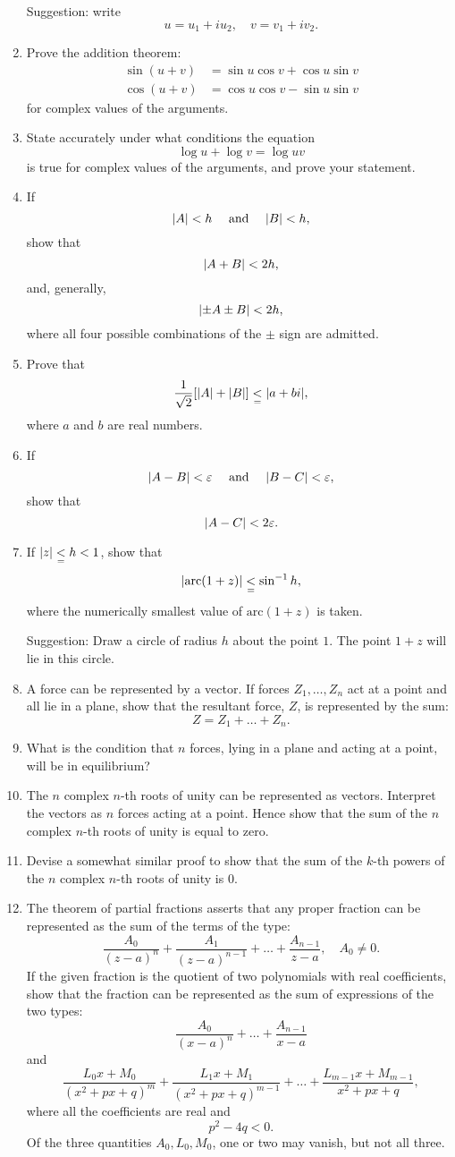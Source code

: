 \documentclass[letter,oneside]{memoir}
\begin{document}
\begin{enumerate}
	Suggestion: write
	\[
	u=u_1+iu_2, \quad v=v_1+iv_2
	.\] 
\item Prove the addition theorem:
	\begin{align*}
		\sin (u+v)&=\sin u\cos v+\cos u\sin v\\
		\cos (u+v)&=\cos u\cos v-\sin u\sin v
	\end{align*} for complex values of the arguments.
\item State accurately under what conditions the equation
	\[
	\log u+\log v=\log uv
	\] is true for complex values of the arguments, and prove your statement.
\item If
	\[
	\abs*{A} <h \quad \text{ and } \quad \abs*{B} <h
	,\] show that
	\[
	\abs*{A+B} <2h
	,\] and, generally,
	\[
	\abs*{\pm A\pm B} <2h
	,\] where all four possible combinations of the $\pm$ sign are admitted.
\item Prove that
	\[
		\frac{1}{\sqrt{2} } \sbr*{\abs*{A} +\abs*{B} } \underset{=}{<} \abs*{a+bi} 
	,\] where $a$ and $b$ are real numbers.
\item If
	\[
	\abs*{A-B} <\epsilon \quad \text{ and } \quad \abs*{B-C} <\epsilon
	,\] show that
	 \[
	\abs*{A-C} <2\epsilon
	.\] 
\item If $\abs*{z} \underset{=}{<} h <1$, show that
	\[
		\abs*{\text{arc} (1+z)} \underset{=}{<} \sin ^{-1}h
	,\] where the numerically smallest value of $\text{arc} (1+z)$ is taken. 

	Suggestion: Draw a circle of radius $h$ about the point $1$. The point $1+z$ will lie in this circle.
\item A force can be represented by a vector. If forces $Z_1, \dots , Z_n$ act at a point and all lie in a plane, show that the resultant force, $Z$, is represented by the sum:
	\[
	Z=Z_1+\dots +Z_n
	.\] 
\item What is the condition that $n$ forces, lying in a plane and acting at a point, will be in equilibrium? 
\item The $n$ complex $n$-th roots of unity can be represented as vectors. Interpret the vectors as $n$ forces acting at a point. Hence show that the sum of the $n$ complex $n$-th roots of unity is equal to zero. 
\item Devise a somewhat similar proof to show that the sum of the $k$-th powers of the $n$ complex $n$-th roots of unity is $0$.
\item The theorem of partial fractions asserts that any proper fraction can be represented as the sum of the terms of the type:
	 \[
		 \frac{A_0}{(z-a)^n} +\frac{A_1}{(z-a)^{n-1}}+\dots +\frac{A_{n-1} }{z-a} , \quad A_0\neq 0
	.\] If the given fraction is the quotient of two polynomials with real coefficients, show that the fraction can be represented as the sum of expressions of the two types:
	\[
		\frac{A_0}{(x-a)^n}+\dots +\frac{A_{n-1} }{x-a} 
	\] and
	\[
		\frac{L_0x+M_0}{(x^2+px+q)^m} +\frac{L_1x+M_1}{(x^2+px+q)^{m-1}} +\dots +\frac{L_{m-1} x+M_{m-1} }{x^2+px+q} 
	,\] where all the coefficients are real and
	\[
	p^2-4q<0
	.\] Of the three quantities $A_0, L_0, M_0$, one or two may vanish, but not all three.
\end{enumerate}
\end{document}

